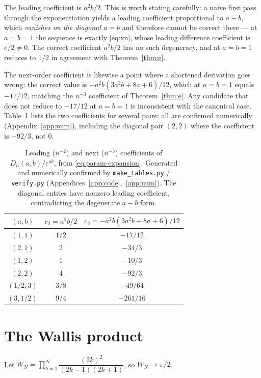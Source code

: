 \documentclass[11pt]{article}
\theoremstyle{plain}
\theoremstyle{remark}
\begin{document}
The leading coefficient is $a^2b/2$. This is worth stating carefully: a naive
first pass through the exponentiation yields a leading coefficient proportional
to $a-b$, which \emph{vanishes on the diagonal $a=b$} and therefore cannot be
correct there --- at $a=b=1$ the sequence is exactly \eqref{eq:xn}, whose
leading difference coefficient is $e/2 \ne 0$. The correct coefficient
$a^2b/2$ has no such degeneracy, and at $a=b=1$ reduces to $1/2$ in agreement
with Theorem~\ref{thm:e}.

The next-order coefficient is likewise a point where a shortened derivation goes
wrong: the correct value is $-a^{2}b(3a^{2}b+8a+6)/12$, which at $a=b=1$ equals
$-17/12$, matching the $n^{-3}$ coefficient of Theorem~\ref{thm:e}. Any
candidate that does not reduce to $-17/12$ at $a=b=1$ is inconsistent with the
canonical case. Table~\ref{tab:param} lists the two coefficients for several
pairs; all are confirmed numerically (Appendix~\ref{app:num}), including the
diagonal pair $(2,2)$ where the coefficient is $-92/3$, not $0$.

\begin{table}[ht]
\centering
\caption{Leading ($n^{-2}$) and next ($n^{-3}$) coefficients of
$D_n(a,b)/e^{ab}$, from \eqref{eq:param-expansion}. Generated and numerically
confirmed by \texttt{make\_tables.py} / \texttt{verify.py}
(Appendices~\ref{app:code},~\ref{app:num}). The diagonal entries have nonzero
leading coefficient, contradicting the degenerate $a-b$ form.}
\label{tab:param}
\begin{tabular}{ccc}
\toprule
$(a,b)$ & $c_2 = a^2b/2$ & $c_3 = -a^2b(3a^2b+8a+6)/12$ \\
\midrule
$(1,1)$   & $1/2$   & $-17/12$  \\
$(2,1)$   & $2$     & $-34/3$   \\
$(1,2)$   & $1$     & $-10/3$   \\
$(2,2)$   & $4$     & $-92/3$   \\
$(1/2,3)$ & $3/8$   & $-49/64$  \\
$(3,1/2)$ & $9/4$   & $-261/16$ \\
\bottomrule
\end{tabular}
\end{table}

\section{The Wallis product}
\label{sec:wallis}

Let $W_N = \prod_{k=1}^{N} \dfrac{(2k)^2}{(2k-1)(2k+1)}$, so $W_N \to \pi/2$.
\end{document}

